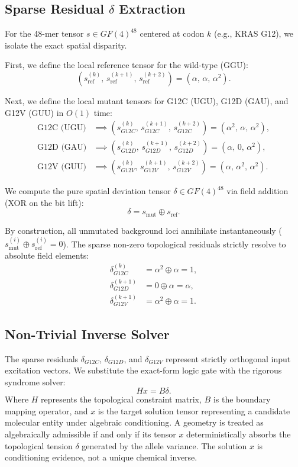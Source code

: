 \subsection{Sparse Residual \(\delta\) Extraction}
For the 48-mer tensor \(s\in GF(4)^{48}\) centered at codon \(k\)
(e.g., KRAS G12), we isolate the exact spatial disparity.

First, we define the local reference tensor for the wild-type (GGU):
\begin{equation}
(s_{\mathrm{ref}}^{(k)},\, s_{\mathrm{ref}}^{(k+1)},\, s_{\mathrm{ref}}^{(k+2)})
= (\alpha,\,\alpha,\,\alpha^2).
\end{equation}

Next, we define the local mutant tensors for G12C (UGU), G12D (GAU), and
G12V (GUU) in \(O(1)\) time:
\begin{align}
\text{G12C (UGU)}
&\implies
(s_{G12C}^{(k)},\, s_{G12C}^{(k+1)},\, s_{G12C}^{(k+2)})
= (\alpha^2,\,\alpha,\,\alpha^2), \\
\text{G12D (GAU)}
&\implies
(s_{G12D}^{(k)},\, s_{G12D}^{(k+1)},\, s_{G12D}^{(k+2)})
= (\alpha,\,0,\,\alpha^2), \\
\text{G12V (GUU)}
&\implies
(s_{G12V}^{(k)},\, s_{G12V}^{(k+1)},\, s_{G12V}^{(k+2)})
= (\alpha,\,\alpha^2,\,\alpha^2).
\end{align}

We compute the pure spatial deviation tensor \(\delta\in GF(4)^{48}\) via
field addition (XOR on the bit lift):
\begin{equation}
\delta = s_{\mathrm{mut}} \oplus s_{\mathrm{ref}}.
\end{equation}

By construction, all unmutated background loci annihilate instantaneously
(\(s_{\mathrm{mut}}^{(i)}\oplus s_{\mathrm{ref}}^{(i)}=0\)). The sparse non-zero
topological residuals strictly resolve to absolute field elements:
\begin{align}
\delta_{G12C}^{(k)} &= \alpha^2 \oplus \alpha = 1, \\
\delta_{G12D}^{(k+1)} &= 0 \oplus \alpha = \alpha, \\
\delta_{G12V}^{(k+1)} &= \alpha^2 \oplus \alpha = 1.
\end{align}

\subsection{Non-Trivial Inverse Solver}
The sparse residuals \(\delta_{G12C}\), \(\delta_{G12D}\), and \(\delta_{G12V}\)
represent strictly orthogonal input excitation vectors. We substitute the
exact-form logic gate with the rigorous syndrome solver:
\begin{equation}
Hx = B\delta.
\end{equation}
Where \(H\) represents the topological constraint matrix, \(B\) is the boundary
mapping operator, and \(x\) is the target solution tensor representing a
candidate molecular entity under algebraic conditioning. A geometry is treated
as algebraically admissible if and only if its tensor \(x\) deterministically
absorbs the topological tension \(\delta\) generated by the allele variance.
The solution \(x\) is conditioning evidence, not a unique chemical inverse.

